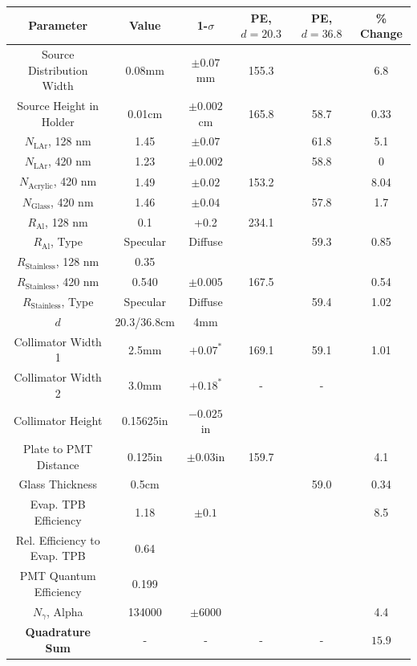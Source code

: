 \documentclass[aps,pra,notitlepage,groupedaddress]{revtex4-1}
\begin{document}
\begin{table}
	\begin{center}
		\begin{tabular}{| c | c | c | c | c | c |}
			\hline
			\textbf{Parameter} & \textbf{Value} & \textbf{1-$\sigma$} & \textbf{PE, $d=20.3$} & \textbf{PE, $d=36.8$} & \textbf{\% Change}\\
			\hline
			Source Distribution Width	&	0.08mm	&	$\pm 0.07$mm	&	155.3	&		&	6.8\\
			Source Height in Holder	&	0.01cm	&	$\pm 0.002$cm	&	165.8	&	58.7	& 0.33	\\
			\hline
			$N_{\text{LAr}}$, 128 nm	&	1.45	&	$\pm 0.07$	&	& 61.8	& 5.1\\
			$N_{\text{LAr}}$, 420 nm	&	1.23	&	$\pm 0.002$	&	&	58.8	& 0\\
			$N_{\text{Acrylic}}$, 420 nm	&	1.49	&	$\pm 0.02$	&	153.2	&	&	8.04 \\
			$N_{\text{Glass}}$, 420 nm	&	1.46	&	$\pm 0.04$	&	& 57.8	& 1.7\\
			$R_{\text{Al}}$, 128 nm	&	0.1	&	+0.2	&	234.1	&	& \color{red}{41} \\
			$R_{\text{Al}}$, Type	&	Specular	&	Diffuse	&	&	59.3	& 0.85\\
			$R_{\text{Stainless}}$, 128 nm	&	0.35	&		&	&	& \\
			$R_{\text{Stainless}}$, 420 nm	&	0.540	&	$\pm 0.005$	&	167.5	&	& 0.54\\
			$R_{\text{Stainless}}$, Type	&	Specular	&	Diffuse	&	&	59.4	& 1.02\\
			\hline
			$d$	&	20.3/36.8cm	&	4mm	&	&	& \\
			Collimator Width 1	&	2.5mm	&	$+0.07^*$	&	169.1	&	59.1	& 1.01\\
			Collimator Width 2	&	3.0mm	&	$+0.18^*$	&	-	&	-	& \\
			Collimator Height	&	0.15625in	&	$-0.025$in	&	&	& \\
			Plate to PMT Distance	&	0.125in	&	$\pm 0.03$in	&	159.7	&	& 4.1\\
			Glass Thickness	&	0.5cm	&		&	&	59.0	& 0.34\\
			\hline
			Evap. TPB Efficiency	&	1.18	&	$\pm 0.1$	&		&		&	8.5\\
			Rel. Efficiency to Evap. TPB	&	0.64	&		&		&		&	\\
			PMT Quantum Efficiency	&	0.199	&		&		&		&	\\
			$N_{\gamma}$, Alpha	&	134000	&	$\pm 6000$	&		&		&	4.4 \\
			\hline
			\hline
			\textbf{Quadrature Sum}	&	-	&	-	&	-	&	-	&	$15.9$	\\

\end{tabular}
\end{center}
\end{table}
\end{document}
